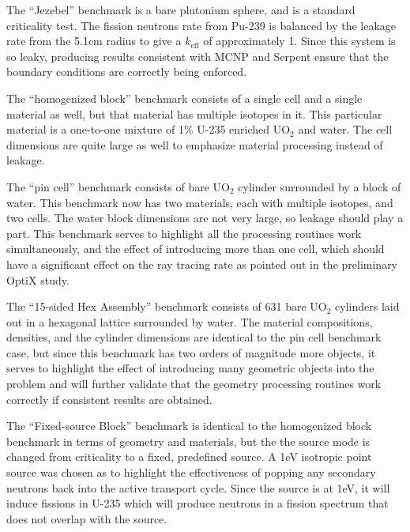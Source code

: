The ``Jezebel'' benchmark is a bare plutonium sphere, and is a standard criticality test.   The fission neutrons rate from Pu-239 is balanced by the leakage rate from the 5.1cm radius to give a $k_\mathrm{eff}$ of approximately 1.  Since this system is so leaky, producing results consistent with MCNP and Serpent ensure that the boundary conditions are correctly being enforced.  

The ``homogenized block'' benchmark consists of a single cell and a single material as well, but that material has multiple isotopes in it.  This particular material is a one-to-one mixture of 1\% U-235 enriched UO$_2$ and water.  The cell dimensions are quite large as well to emphasize material processing instead of leakage.

The ``pin cell'' benchmark consists of bare UO$_2$ cylinder surrounded by a block of water.  This benchmark now has two materials, each with multiple isotopes, and two cells.  The water block dimensions are not very large, so leakage should play a part.  This benchmark serves to highlight all the processing routines work simultaneously, and the effect of introducing more than one cell, which should have a significant effect on the ray tracing rate as pointed out in the preliminary OptiX study.

The ``15-sided Hex Assembly'' benchmark consists of 631 bare UO$_2$ cylinders laid out in a hexagonal lattice surrounded by water.  The material compositions, densities, and the cylinder dimensions are identical to the pin cell benchmark case, but since this benchmark has two orders of magnitude more objects, it serves to highlight the effect of introducing many geometric objects into the problem and will further validate that the geometry processing routines work correctly if consistent results are obtained.

The ``Fixed-source Block'' benchmark is identical to the homogenized block benchmark in terms of geometry and materials, but the the source mode is changed from criticality to a fixed, predefined source.  A 1eV isotropic point source was chosen as to highlight the effectiveness of popping any secondary neutrons back into the active transport cycle.  Since the source is at 1eV, it will induce fissions in U-235 which will produce neutrons in a fission spectrum that does not overlap with the source.  

